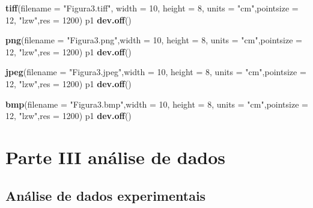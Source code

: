 \documentclass[
]{book}
\newenvironment{Shaded}{\begin{snugshade}}{\end{snugshade}}
\newcommand{\DataTypeTok}[1]{\textcolor[rgb]{0.13,0.29,0.53}{#1}}
\newcommand{\DecValTok}[1]{\textcolor[rgb]{0.00,0.00,0.81}{#1}}
\newcommand{\KeywordTok}[1]{\textcolor[rgb]{0.13,0.29,0.53}{\textbf{#1}}}
\newcommand{\NormalTok}[1]{#1}
\newcommand{\StringTok}[1]{\textcolor[rgb]{0.31,0.60,0.02}{#1}}
\begin{document}
\begin{Shaded}
\begin{Highlighting}[]
\KeywordTok{tiff}\NormalTok{(}\DataTypeTok{filename =} \StringTok{"Figura3.tiff"}\NormalTok{, }\DataTypeTok{width =} \DecValTok{10}\NormalTok{, }\DataTypeTok{height =} \DecValTok{8}\NormalTok{, }
     \DataTypeTok{units =} \StringTok{"cm"}\NormalTok{,}\DataTypeTok{pointsize =} \DecValTok{12}\NormalTok{, }\StringTok{"lzw"}\NormalTok{,}\DataTypeTok{res =} \DecValTok{1200}\NormalTok{)}
\NormalTok{p1}
\KeywordTok{dev.off}\NormalTok{()}

\KeywordTok{png}\NormalTok{(}\DataTypeTok{filename =} \StringTok{"Figura3.png"}\NormalTok{,}\DataTypeTok{width =} \DecValTok{10}\NormalTok{, }\DataTypeTok{height =} \DecValTok{8}\NormalTok{, }
     \DataTypeTok{units =} \StringTok{"cm"}\NormalTok{,}\DataTypeTok{pointsize =} \DecValTok{12}\NormalTok{, }\StringTok{"lzw"}\NormalTok{,}\DataTypeTok{res =} \DecValTok{1200}\NormalTok{)}
\NormalTok{p1}
\KeywordTok{dev.off}\NormalTok{()}

\KeywordTok{jpeg}\NormalTok{(}\DataTypeTok{filename =} \StringTok{"Figura3.jpeg"}\NormalTok{,}\DataTypeTok{width =} \DecValTok{10}\NormalTok{, }\DataTypeTok{height =} \DecValTok{8}\NormalTok{, }
     \DataTypeTok{units =} \StringTok{"cm"}\NormalTok{,}\DataTypeTok{pointsize =} \DecValTok{12}\NormalTok{, }\StringTok{"lzw"}\NormalTok{,}\DataTypeTok{res =} \DecValTok{1200}\NormalTok{)}
\NormalTok{p1}
\KeywordTok{dev.off}\NormalTok{()}

\KeywordTok{bmp}\NormalTok{(}\DataTypeTok{filename =} \StringTok{"Figura3.bmp"}\NormalTok{,}\DataTypeTok{width =} \DecValTok{10}\NormalTok{, }\DataTypeTok{height =} \DecValTok{8}\NormalTok{, }
     \DataTypeTok{units =} \StringTok{"cm"}\NormalTok{,}\DataTypeTok{pointsize =} \DecValTok{12}\NormalTok{, }\StringTok{"lzw"}\NormalTok{,}\DataTypeTok{res =} \DecValTok{1200}\NormalTok{)}
\NormalTok{p1}
\KeywordTok{dev.off}\NormalTok{()}
\end{Highlighting}
\end{Shaded}

\hypertarget{part-parte-iii-anuxe1lise-de-dados}{%
\part{Parte III análise de dados}\label{part-parte-iii-anuxe1lise-de-dados}}

\hypertarget{analdata}{%
\chapter{Análise de dados experimentais}\label{analdata}}
\end{document}
